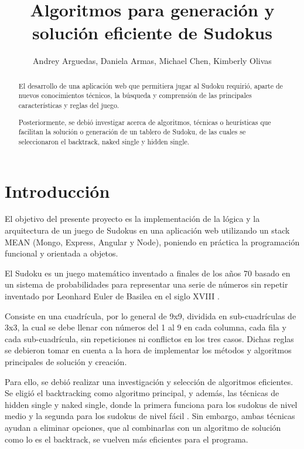 \documentclass[conference]{IEEEtran}
\begin{document}
\title{Algoritmos para generación y solución eficiente de Sudokus}
\author{Andrey Arguedas, Daniela Armas, Michael Chen, Kimberly Olivas}
\maketitle

\begin{otherlanguage}{spanish}
\begin{abstract}
El desarrollo de una aplicación web que permitiera jugar al Sudoku requirió, aparte de nuevos conocimientos técnicos, la búsqueda y comprensión de las principales características y reglas del juego.

Posteriormente, se debió investigar acerca de algoritmos, técnicas o heurísticas que facilitan la solución o generación de un tablero de Sudoku, de las cuales se seleccionaron el backtrack, naked single y hidden single. 
\end{abstract}
\end{otherlanguage}

\section{Introducción}
El objetivo del presente proyecto es la implementación de la lógica y la arquitectura de un juego de Sudokus en una aplicación web utilizando un stack MEAN (Mongo, Express, Angular y Node), poniendo en práctica la programación funcional y orientada a objetos. 

El Sudoku es un juego matemático inventado a finales de los años 70 basado en un sistema de probabilidades para representar una serie de números sin repetir inventado por Leonhard Euler de Basilea en el siglo XVIII \cite{sudokuWiki}. 

\centering

Consiste en una cuadrícula, por lo general de 9x9, dividida en sub-cuadrículas de 3x3, la cual se debe llenar con números del 1 al 9 en cada columna, cada fila y cada sub-cuadrícula, sin repeticiones ni conflictos en los tres casos. Dichas reglas se debieron tomar en cuenta a la hora de implementar los métodos y algoritmos principales de solución y creación.

Para ello, se debió realizar una investigación y selección de algoritmos eficientes. Se eligió el backtracking como algoritmo principal, y además, las técnicas de hidden single y naked single, donde la primera funciona para los sudokus de nivel medio y la segunda para los sudokus de nivel fácil \cite{hodoku}. Sin embargo, ambas técnicas ayudan a eliminar opciones, que al combinarlas con un algoritmo de solución como lo es el backtrack, se vuelven más eficientes para el programa.
\end{document}
